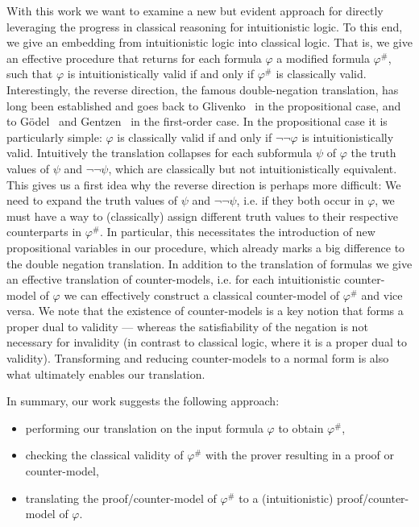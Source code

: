 \documentclass[runningheads]{llncs}
\begin{document}
With this work we want to examine a new but evident approach for directly leveraging the progress in classical reasoning for intuitionistic logic.
To this end, we give an embedding from intuitionistic logic into classical logic. That is, we give an effective procedure that returns for each formula $\varphi$ a modified formula $\varphi^\#$, such that $\varphi$ is intuitionistically valid if and only if $\varphi^\#$ is classically valid.
Interestingly, the reverse direction, the famous double-negation translation, has long been established and goes back to Glivenko~\cite{glivenko1929quelques} in the propositional case, and to G\"odel~\cite{godel1933intuitionistischen} and Gentzen~\cite{gentzen1936widerspruchsfreiheit} in the first-order case. In the propositional case it is particularly simple: $\varphi$ is classically valid if and only if $\neg\neg\varphi$ is intuitionistically valid. Intuitively the translation collapses for each subformula $\psi$ of $\varphi$ the truth values of $\psi$ and $\neg\neg\psi$, which are classically but not intuitionistically equivalent. This gives us a first idea why the reverse direction is perhaps more difficult: We need to expand the truth values of $\psi$ and $\neg\neg\psi$, i.e. if they both occur in $\varphi$, we must have a way to (classically) assign different truth values to their respective counterparts in $\varphi^\#$. In particular, this necessitates the introduction of new propositional variables in our procedure, which already marks a big difference to the double negation translation.
%
In addition to the translation of formulas we give an effective translation of counter-models, i.e. for each intuitionistic counter-model of $\varphi$ we can effectively construct a classical counter-model of $\varphi^\#$ and vice versa.
We note that the existence of counter-models is a key notion that forms a proper dual to validity --- whereas the satisfiability of the negation is not necessary for invalidity (in contrast to classical logic, where it is a proper dual to validity).
Transforming and reducing counter-models to a normal form is also what ultimately enables our translation.

In summary, our work suggests the following approach:
\begin{itemize}
	\item performing our translation on the input formula $\varphi$ to obtain $\varphi^\#$,
	\item checking the classical validity of $\varphi^\#$ with the prover resulting in a proof or counter-model,
	\item translating the proof/counter-model of $\varphi^\#$ to a (intuitionistic) proof/counter-model of $\varphi$.
\end{itemize}
\end{document}
